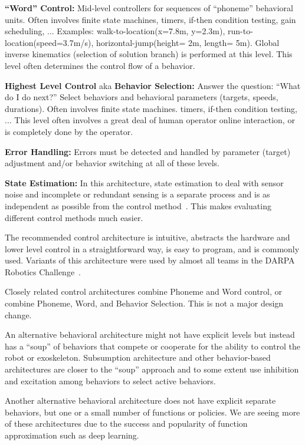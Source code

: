 \documentclass[letterpaper,12pt,fullpage]{article}
\begin{document}
{\bf ``Word'' Control:} Mid-level controllers for sequences of ``phoneme'' behavioral
units.
Often involves finite state machines, timers, if-then condition testing, gain
scheduling, ...
Examples: walk-to-location(x=7.8m, y=2.3m), run-to-location(speed=3.7m/s),
horizontal-jump(height= 2m, length= 5m).
Global inverse kinematics (selection of solution branch) is performed at this level.
This level often determines the control flow of a behavior.

{\bf Highest Level Control} aka {\bf Behavior Selection:} 
Answer the question: ``What do I do next?''
Select behaviors and behavioral parameters (targets,
speeds, durations).
Often involves finite state machines. timers, if-then condition testing, ...
This level often involves a great deal of human operator online interaction,
or is completely done by the operator.

{\bf Error Handling:} Errors must be detected and handled by parameter (target)
adjustment and/or behavior switching
at all of these levels.

{\bf State Estimation:}
In this architecture, state estimation to deal with sensor noise and incomplete or
redundant sensing is a separate process and is as independent as possible
from the control method~\cite{certainty-eq,separation-prin}.
This makes evaluating different control methods much easier.

The recommended control architecture is intuitive, abstracts the hardware 
and lower level control in a straightforward way, is easy to program, and is
commonly used. Variants of this architecture were used by almost all teams
in the DARPA Robotics Challenge~\cite{}.

Closely related control architectures combine Phoneme and Word control,
or combine Phoneme, Word, and Behavior Selection.
This is not a major design change.

An alternative behavioral architecture might not have explicit levels but instead
has a ``soup'' of behaviors that compete or cooperate for the ability to
control the robot or exoskeleton. Subsumption architecture and other behavior-based
architectures are closer to the ``soup'' approach and to some extent
use inhibition and excitation
among behaviors to select active behaviors.

Another alternative behavioral architecture does not have explicit separate behaviors,
but one or a small number of functions or policies. 
We are seeing more of these architectures
due to the success and popularity of function approximation such as
deep learning.
\end{document}
